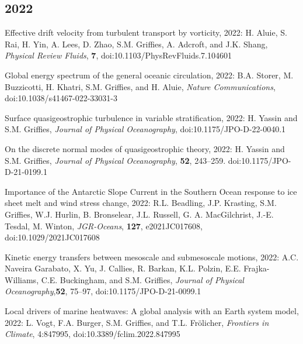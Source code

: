 \small 

\begin{etaremune}

\subsection*{\sc \color{Maroon} 2022}

\item Effective drift velocity from turbulent transport by vorticity, 2022: H. Aluie, S. Rai, H. Yin, A. Lees, D. Zhao, S.M. Grif\/f\/ies, A. Adcroft, and J.K. Shang, {\it  Physical Review Fluids}, {\bf 7}, doi:10.1103/PhysRevFluids.7.104601

\item Global energy spectrum of the general oceanic circulation, 2022: B.A. Storer, M. Buzzicotti, H. Khatri, S.M. Grif\/f\/ies, and H. Aluie, {\it Nature Communications}, doi:10.1038/s41467-022-33031-3



\item Surface quasigeostrophic turbulence in variable stratification, 2022: H. Yassin and S.M. Grif\/f\/ies,  {\it Journal of Physical Oceanography}, doi:10.1175/JPO-D-22-0040.1

\item On the discrete normal modes of quasigeostrophic theory, 2022: H. Yassin and S.M. Grif\/f\/ies,  {\it Journal of Physical Oceanography}, {\bf 52}, 243--259.  doi:10.1175/JPO-D-21-0199.1

\item Importance of the Antarctic Slope Current in the Southern Ocean response to ice sheet melt and wind stress change, 2022: R.L. Beadling, J.P. Krasting, S.M. Grif\/f\/ies, W.J. Hurlin, B. Bronselear, J.L. Russell, G. A. MacGilchrist, J.-E. Tesdal, M. Winton, {\it JGR-Oceans}, {\bf 127}, e2021JC017608, doi:10.1029/2021JC017608

\item Kinetic energy transfers between mesoscale and submesoscale motions, 2022: A.C. Naveira Garabato, X. Yu, J. Callies, R. Barkan, K.L. Polzin, E.E. Frajka-Williams, C.E. Buckingham, and S.M. Grif\/f\/ies, {\it Journal of Physical Oceanography},{\bf 52}, 75--97, doi:10.1175/JPO-D-21-0099.1

\item Local drivers of marine heatwaves: A global analysis with an Earth system model, 2022: L. Vogt, F.A. Burger, S.M. Grif\/f\/ies, and T.L. {Fr\"{o}licher}, {\it Frontiers in Climate}, 4:847995,  doi:10.3389/fclim.2022.847995


\end{etaremune}

